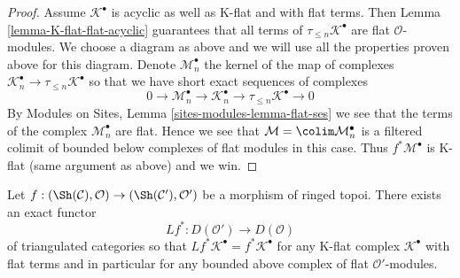 \begin{proof}
\medskip\noindent
Assume $\mathcal{K}^\bullet$ is acyclic as well as K-flat and
with flat terms. Then Lemma \ref{lemma-K-flat-flat-acyclic}
guarantees that all terms of $\tau_{\leq n}\mathcal{K}^\bullet$
are flat $\mathcal{O}$-modules. We choose a diagram as above and
we will use all the properties proven above for this diagram.
Denote $\mathcal{M}_n^\bullet$ the kernel of the map of complexes
$\mathcal{K}_n^\bullet \to \tau_{\leq n}\mathcal{K}^\bullet$
so that we have short exact sequences of complexes
$$
0 \to \mathcal{M}_n^\bullet \to \mathcal{K}_n^\bullet \to
\tau_{\leq n}\mathcal{K}^\bullet \to 0
$$
By Modules on Sites, Lemma \ref{sites-modules-lemma-flat-ses}
we see that the terms of the complex $\mathcal{M}_n^\bullet$ are flat.
Hence we see that $\mathcal{M} = \colim \mathcal{M}_n^\bullet$
is a filtered colimit of bounded below complexes of flat modules
in this case. Thus $f^*\mathcal{M}^\bullet$ is K-flat
(same argument as above) and we win.
\end{proof}

\begin{lemma}
\label{lemma-derived-base-change}
Let $f : (\Sh(\mathcal{C}), \mathcal{O}) \to (\Sh(\mathcal{C}'), \mathcal{O}')$
be a morphism of ringed topoi. There exists an exact functor
$$
Lf^* : D(\mathcal{O}') \longrightarrow D(\mathcal{O})
$$
of triangulated categories so that
$Lf^*\mathcal{K}^\bullet = f^*\mathcal{K}^\bullet$ for any
K-flat complex $\mathcal{K}^\bullet$ with flat terms and
in particular for any bounded above complex of flat $\mathcal{O}'$-modules.
\end{lemma}

